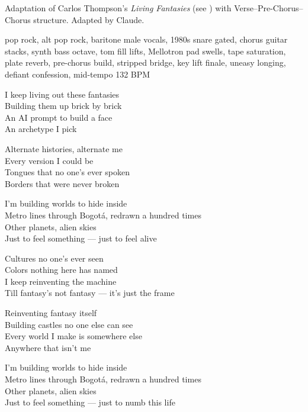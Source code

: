 
\begin{notes}
Adaptation of Carlos Thompson's \emph{Living Fantasies} (see \pageref{sec:living-fantasies}) with Verse--Pre-Chorus--Chorus structure. Adapted by Claude.
\end{notes}
\begin{style}
pop rock, alt pop rock, baritone male vocals, 1980s snare gated, chorus guitar stacks, synth bass octave, tom fill lifts, Mellotron pad swells, tape saturation, plate reverb, pre-chorus build, stripped bridge, key lift finale, uneasy longing, defiant confession, mid-tempo 132 BPM
\end{style}
\begin{lyrics}
I keep living out these fantasies\\
Building them up brick by brick\\
An AI prompt to build a face\\
An archetype I pick

Alternate histories, alternate me\\
Every version I could be\\
Tongues that no one's ever spoken\\
Borders that were never broken

I'm building worlds to hide inside\\
Metro lines through Bogotá, redrawn a hundred times\\
Other planets, alien skies\\
Just to feel something — just to feel alive

Cultures no one's ever seen\\
Colors nothing here has named\\
I keep reinventing the machine\\
Till fantasy's not fantasy — it's just the frame

Reinventing fantasy itself\\
Building castles no one else can see\\
Every world I make is somewhere else\\
Anywhere that isn't me

I'm building worlds to hide inside\\
Metro lines through Bogotá, redrawn a hundred times\\
Other planets, alien skies\\
Just to feel something — just to numb this life


\end{lyrics}
